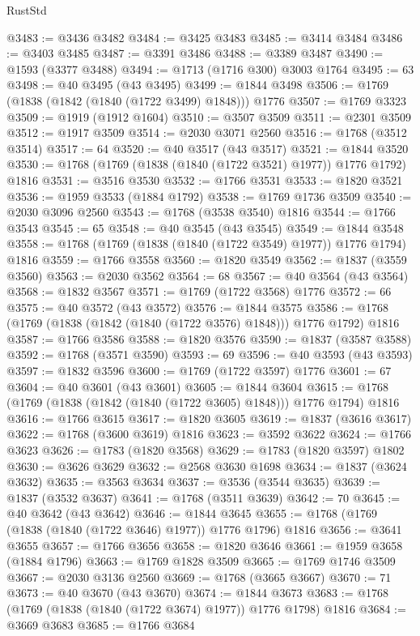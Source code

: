 \begin{lexlean}{RustStd}
\begin{coremodule}
@3483 := @3436 @3482
@3484 := @3425 @3483
@3485 := @3414 @3484
@3486 := @3403 @3485
@3487 := @3391 @3486
@3488 := @3389 @3487
@3490 := @1593 (@3377 @3488)
@3494 := @1713 (@1716 @300) @3003 @1764
@3495 := 63
@3498 := @40 @3495 (@43 @3495)
@3499 := @1844 @3498
@3506 := @1769 (@1838 (@1842 (@1840 (@1722 @3499) @1848))) @1776
@3507 := @1769 @3323
@3509 := @1919 (@1912 @1604)
@3510 := @3507 @3509
@3511 := @2301 @3509
@3512 := @1917 @3509
@3514 := @2030 @3071 @2560
@3516 := @1768 (@3512 @3514)
@3517 := 64
@3520 := @40 @3517 (@43 @3517)
@3521 := @1844 @3520
@3530 := @1768 (@1769 (@1838 (@1840 (@1722 @3521) @1977)) @1776 @1792) @1816
@3531 := @3516 @3530
@3532 := @1766 @3531
@3533 := @1820 @3521
@3536 := @1959 @3533 (@1884 @1792)
@3538 := @1769 @1736 @3509
@3540 := @2030 @3096 @2560
@3543 := @1768 (@3538 @3540) @1816
@3544 := @1766 @3543
@3545 := 65
@3548 := @40 @3545 (@43 @3545)
@3549 := @1844 @3548
@3558 := @1768 (@1769 (@1838 (@1840 (@1722 @3549) @1977)) @1776 @1794) @1816
@3559 := @1766 @3558
@3560 := @1820 @3549
@3562 := @1837 (@3559 @3560)
@3563 := @2030 @3562
@3564 := 68
@3567 := @40 @3564 (@43 @3564)
@3568 := @1832 @3567
@3571 := @1769 (@1722 @3568) @1776
@3572 := 66
@3575 := @40 @3572 (@43 @3572)
@3576 := @1844 @3575
@3586 := @1768 (@1769 (@1838 (@1842 (@1840 (@1722 @3576) @1848))) @1776 @1792) @1816
@3587 := @1766 @3586
@3588 := @1820 @3576
@3590 := @1837 (@3587 @3588)
@3592 := @1768 (@3571 @3590)
@3593 := 69
@3596 := @40 @3593 (@43 @3593)
@3597 := @1832 @3596
@3600 := @1769 (@1722 @3597) @1776
@3601 := 67
@3604 := @40 @3601 (@43 @3601)
@3605 := @1844 @3604
@3615 := @1768 (@1769 (@1838 (@1842 (@1840 (@1722 @3605) @1848))) @1776 @1794) @1816
@3616 := @1766 @3615
@3617 := @1820 @3605
@3619 := @1837 (@3616 @3617)
@3622 := @1768 (@3600 @3619) @1816
@3623 := @3592 @3622
@3624 := @1766 @3623
@3626 := @1783 (@1820 @3568)
@3629 := @1783 (@1820 @3597) @1802
@3630 := @3626 @3629
@3632 := @2568 @3630 @1698
@3634 := @1837 (@3624 @3632)
@3635 := @3563 @3634
@3637 := @3536 (@3544 @3635)
@3639 := @1837 (@3532 @3637)
@3641 := @1768 (@3511 @3639)
@3642 := 70
@3645 := @40 @3642 (@43 @3642)
@3646 := @1844 @3645
@3655 := @1768 (@1769 (@1838 (@1840 (@1722 @3646) @1977)) @1776 @1796) @1816
@3656 := @3641 @3655
@3657 := @1766 @3656
@3658 := @1820 @3646
@3661 := @1959 @3658 (@1884 @1796)
@3663 := @1769 @1828 @3509
@3665 := @1769 @1746 @3509
@3667 := @2030 @3136 @2560
@3669 := @1768 (@3665 @3667)
@3670 := 71
@3673 := @40 @3670 (@43 @3670)
@3674 := @1844 @3673
@3683 := @1768 (@1769 (@1838 (@1840 (@1722 @3674) @1977)) @1776 @1798) @1816
@3684 := @3669 @3683
@3685 := @1766 @3684

\end{coremodule}
\end{lexlean}
